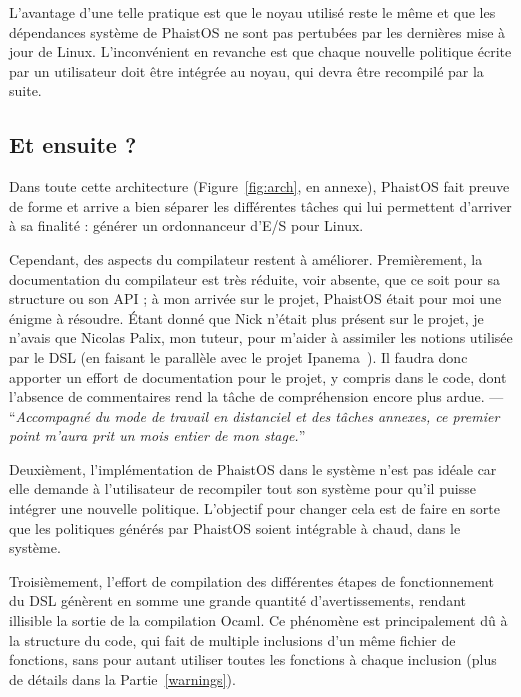 L'avantage d'une telle pratique est que le noyau utilisé reste le même et que 
les dépendances système de PhaistOS ne sont pas pertubées par les dernières 
mise à jour de Linux. L'inconvénient en revanche est que chaque nouvelle 
politique écrite par un utilisateur doit être intégrée au noyau, qui devra être 
recompilé par la suite.

\subsection{Et ensuite ?}

Dans toute cette architecture (Figure~\ref{fig:arch}, en annexe), PhaistOS fait 
preuve de forme et arrive a bien séparer les différentes tâches qui lui 
permettent d'arriver à sa finalité : générer un ordonnanceur d'E/S pour Linux.

Cependant, des aspects du compilateur restent à améliorer. Premièrement, la 
documentation du compilateur est très réduite, voir absente, que ce soit pour 
sa structure ou son API ; à mon arrivée sur le projet, PhaistOS était pour moi 
une énigme à résoudre. Étant donné que Nick n'était plus présent sur le projet, 
je n'avais que Nicolas Palix, mon tuteur, pour m'aider à assimiler les notions 
utilisée par le DSL (en faisant le parallèle avec le projet Ipanema~\cite
{lepers2020provable}). Il faudra donc apporter un effort de documentation pour 
le projet, y compris dans le code, dont l'absence de commentaires rend la tâche 
de compréhension encore plus ardue. --- ``\textit{Accompagné du mode de travail 
en distanciel et des tâches annexes, ce premier point m'aura prit un mois 
entier de mon stage.}''

Deuxièment, l'implémentation de PhaistOS dans le système n'est pas idéale car 
elle demande à l'utilisateur de recompiler tout son système pour qu'il puisse 
intégrer une nouvelle politique. L'objectif pour changer cela est de faire en 
sorte que les politiques générés par PhaistOS soient intégrable à chaud, dans 
le système.

Troisièmement, l'effort de compilation des différentes étapes de fonctionnement 
du DSL génèrent en somme une grande quantité d'avertissements, rendant 
illisible la sortie de la compilation Ocaml. Ce phénomène est principalement dû 
à la structure du code, qui fait de multiple inclusions d'un même fichier de 
fonctions, sans pour autant utiliser toutes les fonctions à chaque inclusion 
(plus de détails dans la Partie~\ref{warnings}). 

